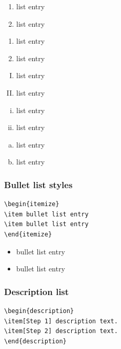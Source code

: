 \documentclass[11pt]{article}
\begin{document}
\begin{enumerate}[1.]
\item list entry
\item list entry
\end{enumerate}

\begin{enumerate}[(1)]
\item list entry
\item list entry
\end{enumerate}

\begin{enumerate}[I.]
\item list entry
\item list entry
\end{enumerate}

\begin{enumerate}[i.]
\item list entry
\item list entry
\end{enumerate}

\begin{enumerate}[(a)]
\item list entry
\item list entry
\end{enumerate}


\subsubsection{Bullet list styles}

\begin{verbatim}
\begin{itemize}
\item bullet list entry
\item bullet list entry
\end{itemize}
\end{verbatim}
\begin{itemize}
\item bullet list entry
\item bullet list entry
\end{itemize}


\subsubsection{Description list}

\begin{verbatim}
\begin{description}
\item[Step 1] description text.
\item[Step 2] description text.
\end{description}
\end{verbatim}
\end{document}
